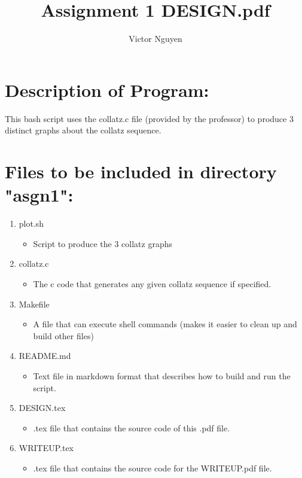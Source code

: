 \documentclass[11pt]{article}
\title{Assignment 1 DESIGN.pdf}
\author{Victor Nguyen}
\begin{document}
\maketitle

\section{Description of Program:}
This bash script uses the collatz.c file (provided by the professor) to produce 3 distinct graphs
about the collatz sequence.


\section{Files to be included in directory "asgn1":}

\begin{enumerate}
    \item
    plot.sh
    \begin{itemize}
        \item
        Script to produce the 3 collatz graphs
    \end{itemize}

    \item
    collatz.c
    \begin{itemize}
        \item
        The c code that generates any given collatz sequence if specified.
    \end{itemize}

    \item
    Makefile
    \begin{itemize}
        \item
        A file that can execute shell commands (makes it easier to clean up and build other files)
    \end{itemize}

    \item
    README.md
    \begin{itemize}
        \item
        Text file in markdown format that describes how to build and run the script. 
    \end{itemize}

    \item
    DESIGN.tex
    \begin{itemize}
        \item
        .tex file that contains the source code of this .pdf file.
    \end{itemize}

    \item
    WRITEUP.tex
    \begin{itemize}
        \item
        .tex file that contains the source code for the WRITEUP.pdf file.
    \end{itemize}
\end{enumerate}
\end{document}
